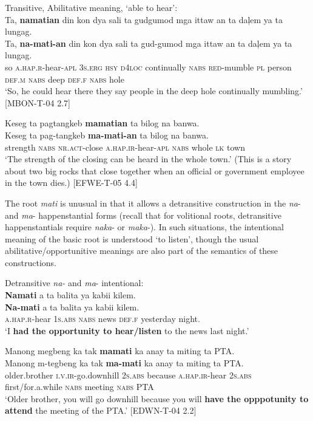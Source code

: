 \ea
Transitive, Abilitative meaning, ‘able to hear’: \\
Ta,  \textbf{namatian}  din  kon  dya  sali  ta   gudgumod  mga  ittaw  an  ta  daļem  ya  ta  lungag. \\\smallskip
\gll Ta,  \textbf{na-mati-an}  din  kon  dya  sali  ta   gud-gumod  mga  ittaw  an  ta  daļem  ya  ta  lungag. \\
so  \textsc{a.hap.r}-hear-\textsc{apl}  3\textsc{s.erg}  \textsc{hsy}  \textsc{d4loc}  continually  \textsc{nabs}
\textsc{red}-mumble  \textsc{pl}  person  \textsc{def.m}  \textsc{nabs}  deep  \textsc{def.f}  \textsc{nabs}  hole \\
\glt `So, he could hear there they say people in the deep hole continually mumbling.’ [MBON-T-04 2.7]
\z

\ea
Keseg  ta  pagtangkeb  \textbf{mamatian}  ta  bilog  na  banwa. \\\smallskip
\gll Keseg  ta  pag-tangkeb  \textbf{ma-mati-an}  ta  bilog  na  banwa. \\
strength  \textsc{nabs}  \textsc{nr.act}-close  \textsc{a.hap.ir}-hear-\textsc{apl}  \textsc{nabs}  whole  \textsc{lk}  town \\
\glt ‘The strength of the closing can be heard in the whole town.’ (This is a story about two big rocks that close together when an official or government employee in the town dies.) [EFWE-T-05 4.4]
\z

The root \textit{mati} is unusual in that it allows a detransitive construction in the \textit{na}{}- and \textit{ma}{}- happenstantial forms (recall that for volitional roots, detransitive happenstantials require \textit{naka}{}- or \textit{maka}{}-). In such situations, the intentional meaning of the basic root is understood ‘to listen’, though the usual abilitative/opportunitive meanings are also part of the semantics of these constructions.

\ea
Detransitive \textit{na-} and \textit{ma}{}- intentional: \\
\textbf{Namati}  a  ta  balita  ya  kabii  kilem. \\\smallskip
\gll \textbf{Na-mati}  a  ta  balita  ya  kabii  kilem. \\
\textsc{a.hap.r}-hear  1\textsc{s.abs}  \textsc{nabs}  news  \textsc{def.f}  yesterday  night. \\
\glt ‘I \textbf{had the opportunity to hear/listen} to the news last night.’
\z

\ea
Manong  megbeng  ka  tak  \textbf{mamati}  ka anay   ta  miting    ta  PTA.\\\smallskip
\gll Manong  m-tegbeng  ka  tak  \textbf{ma-mati}  ka anay   ta  miting    ta  PTA.\\
older.brother  \textsc{i.v.ir}-go.downhill  2\textsc{s.abs}  because  \textsc{a.hap.ir}-hear  2\textsc{s.abs} first/for.a.while  \textsc{nabs}  meeting  \textsc{nabs}  PTA \\
\glt `Older brother, you will go downhill because you will \textbf{have the opppotunity to attend} the meeting of the PTA.’ [EDWN-T-04 2.2]
\z

